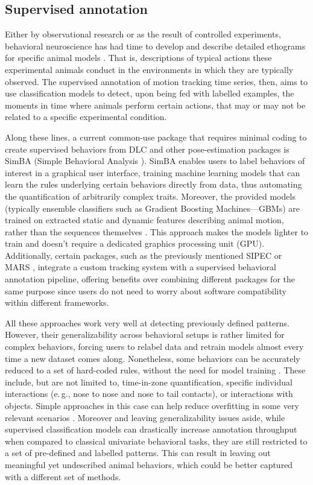 \subsection{Supervised annotation}

Either by observational research or as the result of controlled experiments, behavioral neuroscience has had time to develop and describe detailed ethograms for specific animal models \cite{deChaumont2019Real-timeLearning}. That is, descriptions of typical actions these experimental animals conduct in the environments in which they are typically observed. The supervised annotation of motion tracking time series, then, aims to use classification models to detect, upon being fed with labelled examples, the moments in time where animals perform certain actions, that may or may not be related to a specific experimental condition. 

Along these lines, a current common-use package that requires minimal coding to create supervised behaviors from DLC and other pose-estimation packages is SimBA (Simple Behavioral Analysis \cite{Ro2020SimpleAnimals}). SimBA enables users to label behaviors of interest in a graphical user interface, training machine learning models that can learn the rules underlying certain behaviors directly from data, thus automating the quantification of arbitrarily complex traits. Moreover, the provided models (typically ensemble classifiers such as Gradient Boosting Machines---GBMs) are trained on extracted static and dynamic features describing animal motion, rather than the sequences themselves \cite{Burns2018Seglearn:Series}. This approach makes the models lighter to train and doesn't require a dedicated graphics processing unit (GPU). Additionally, certain packages, such as the previously mentioned SIPEC \cite{Marks2022Deep-learning-basedEnvironments} or MARS \cite{Segalin2021TheMice}, integrate a custom tracking system with a supervised behavioral annotation pipeline, offering benefits over combining different packages for the same purpose since users do not need to worry about software compatibility within different frameworks. 

All these approaches work very well at detecting previously defined patterns. However, their generalizability across behavioral setups is rather limited for complex behaviors, forcing users to relabel data and retrain models almost every time a new dataset comes along. Nonetheless, some behaviors can be accurately reduced to a set of hard-coded rules, without the need for model training \cite{Shultz2017CurseDimensionality}. These include, but are not limited to, time-in-zone quantification, specific individual interactions (e.\,g., nose to nose and nose to tail contacts), or interactions with objects. Simple approaches in this case can help reduce overfitting in some very relevant scenarios \cite{Bordes2023AutomaticallyStress}. Moreover and leaving generalizability issues aside, while supervised classification models can drastically increase annotation throughput when compared to classical univariate behavioral tasks, they are still restricted to a set of pre-defined and labelled patterns. This can result in leaving out meaningful yet undescribed animal behaviors, which could be better captured with a different set of methods.

